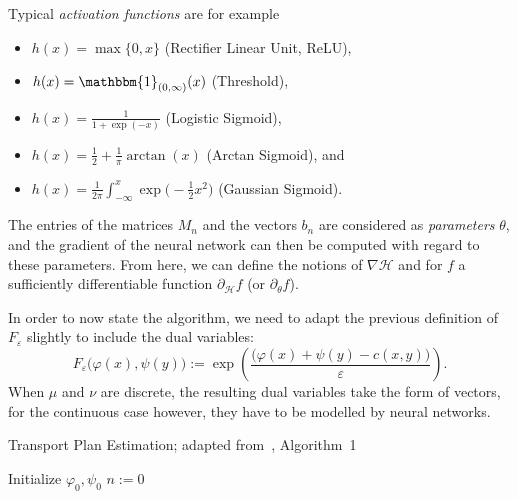 \begin{remark}
	Typical \textit{activation functions} are for example
	\begin{itemize}
		\item $h(x) = \max\{ 0 , x \}$ (Rectifier Linear Unit, ReLU),
		\item $h(x) = \mathbbm{1}_{(0, \infty)}(x)$ (Threshold),
		\item $h(x) = \frac{1}{1 + \exp(-x)}$ (Logistic Sigmoid),
		\item $h(x) = \frac{1}{2} + \frac{1}{\pi} \arctan(x)$ (Arctan Sigmoid), and
		\item $h(x) = \frac{1}{2\pi} \int_{-\infty}^x \exp\big( -\frac{1}{2} x^2 \big)$ (Gaussian Sigmoid).
	\end{itemize}
\end{remark}

The entries of the matrices $M_n$ and the vectors $b_n$ are considered as \textit{parameters} $\theta$, and the gradient of the neural network can then be computed with regard to these parameters. From here, we can define the notions of $\nabla \mathcal{H}$ and for $f$ a sufficiently differentiable function $\partial_{\mathcal{H}} f$ (or $\partial_\theta f$). 

In order to now state the algorithm, we need to adapt the previous definition of $F_\varepsilon$ slightly to include the dual variables:
\[ F_\varepsilon\big( \varphi(x), \psi(y) \big) := \exp\left( \frac{\big( \varphi(x) + \psi(y) - c(x, y) \big)}{\varepsilon} \right). \]
When $\mu$ and $\nu$ are discrete, the resulting dual variables take the form of vectors, for the continuous case however, they have to be modelled by neural networks.

\begin{algorithm}\label{OTPlanEstAlg}
	\caption{Transport Plan Estimation; adapted from~\cite{Seg2018}, Algorithm~1}
	Initialize $\varphi_0, \psi_0$\;
	$n := 0$\;
\end{algorithm}

